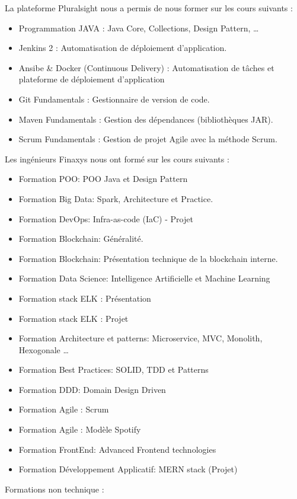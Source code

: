 La plateforme Pluralsight nous a permis de nous former sur les cours suivants :
\begin{itemize}  
    \item Programmation JAVA : Java Core, Collections, Design Pattern, …
    \item Jenkins 2 : Automatisation de déploiement d’application.
    \item Ansibe \& Docker (Continuous Delivery) : Automatisation de tâches et plateforme de déploiement d’application
    \item Git Fundamentals : Gestionnaire de version de code.
    \item Maven Fundamentals : Gestion des dépendances (bibliothèques JAR).
    \item Scrum Fundamentals : Gestion de projet Agile avec la méthode Scrum.
\end{itemize}
Les ingénieurs Finaxys nous ont formé sur les cours suivants :
\begin{itemize}  
    \item Formation POO: POO Java et Design Pattern
    \item Formation Big Data: Spark, Architecture et Practice.
    \item Formation DevOps: Infra-as-code (IaC) - Projet
    \item Formation Blockchain: Généralité.
    \item Formation Blockchain: Présentation technique de la blockchain interne.
    \item Formation Data Science: Intelligence Artificielle et Machine Learning
    \item Formation stack ELK : Présentation
    \item Formation stack ELK : Projet
    \item Formation Architecture et patterns: Microservice, MVC, Monolith, Hexogonale \dots
    \item Formation Best Practices: SOLID, TDD et Patterns
    \item Formation DDD: Domain Design Driven
    \item Formation Agile : Scrum
    \item Formation Agile : Modèle Spotify
    \item Formation FrontEnd: Advanced Frontend technologies
    \item Formation Développement Applicatif: MERN stack (Projet)
\end{itemize}
Formations non technique :
